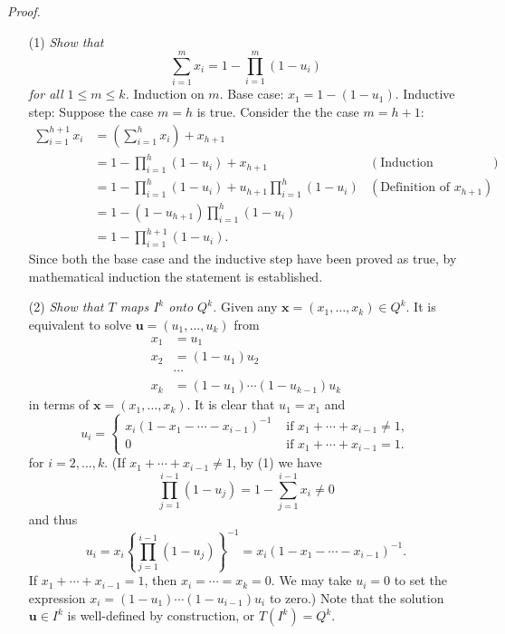 \documentclass{article}
\begin{document}
\emph{Proof.}
\begin{enumerate}
\item[(1)]
  \emph{Show that
  \[
    \sum_{i=1}^{m} x_i = 1 - \prod_{i=1}^{m} (1-u_i)
  \]
  for all $1 \leq m \leq k$.}
  Induction on $m$.
  Base case: $x_1 = 1 - (1-u_1)$.
  Inductive step: Suppose the case $m = h$ is true.
  Consider the the case $m = h+1$:
  \begin{align*}
    \sum_{i=1}^{h+1} x_i
    &= \left( \sum_{i=1}^{h} x_i \right) + x_{h+1} \\
    &= 1 - \prod_{i=1}^{h} (1-u_i) + x_{h+1}
      &(\text{Induction hypothesis}) \\
    &= 1 - \prod_{i=1}^{h} (1-u_i) + u_{h+1}\prod_{i=1}^{h} (1-u_i)
      &(\text{Definition of $x_{h+1}$}) \\
    &= 1 - (1-u_{h+1})\prod_{i=1}^{h} (1-u_i) \\
    &= 1 - \prod_{i=1}^{h+1} (1-u_i).
  \end{align*}
  Since both the base case and the inductive step have been proved as true,
  by mathematical induction the statement is established.

\item[(2)]
  \emph{Show that $T$ maps $I^k$ onto $Q^k$.}
  Given any $\mathbf{x} = (x_1,\ldots,x_k) \in Q^k$.
  It is equivalent to solve $\mathbf{u} = (u_1, \ldots, u_k)$ from
  \begin{align*}
    x_1 &= u_1 \\
    x_2 &= (1-u_1)u_2 \\
    &\cdots \\
    x_k &= (1-u_1) \cdots (1-u_{k-1})u_k
  \end{align*}
  in terms of $\mathbf{x} = (x_1, \ldots, x_k)$.
  It is clear that $u_1 = x_1$
  and
  \begin{equation*}
    u_i =
      \begin{cases}
        x_i(1 - x_1 - \cdots - x_{i-1})^{-1}
          & \text{ if $x_1+\cdots+x_{i-1} \neq 1$}, \\
        0
          & \text{ if $x_1+\cdots+x_{i-1} = 1$}.
      \end{cases}
  \end{equation*}
  for $i = 2, \ldots, k$.
  (If $x_1+\cdots+x_{i-1} \neq 1$, by (1) we have
  \[
    \prod_{j=1}^{i-1}(1-u_j)
    = 1 - \sum_{j=1}^{i-1} x_i
    \neq 0
  \]
  and thus
  \[
    u_i
    = x_i \left\{ \prod_{j=1}^{i-1}(1-u_j) \right\}^{-1}
    = x_i(1 - x_1 - \cdots - x_{i-1})^{-1}.
  \]
  If $x_1+\cdots+x_{i-1} = 1$,
  then $x_{i} = \cdots = x_{k} = 0$.
  We may take $u_{i} = 0$ to set the expression $x_{i} = (1-u_1)\cdots(1-u_{i-1})u_i$ to zero.)
  Note that the solution $\mathbf{u} \in I^k$ is well-defined by construction,
  or $T(I^k) = Q^k$.


\end{enumerate}
\end{document}

